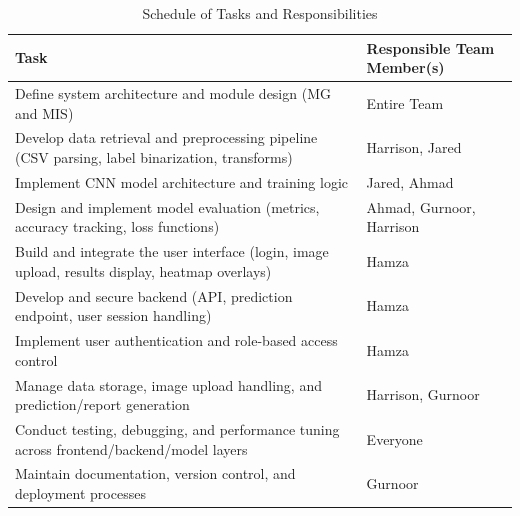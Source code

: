 \documentclass[12pt, titlepage]{article}
\begin{document}
\begin{table}[h!]
\centering
\begin{tabular}{|p{10cm}|l|}
\hline
\textbf{Task} & \textbf{Responsible Team Member(s)} \\
\hline
Define system architecture and module design (MG and MIS) & Entire Team \\
\hline
Develop data retrieval and preprocessing pipeline (CSV parsing, label binarization, transforms) & Harrison, Jared \\
\hline
Implement CNN model architecture and training logic & Jared, Ahmad \\
\hline
Design and implement model evaluation (metrics, accuracy tracking, loss functions) & Ahmad, Gurnoor, Harrison \\
\hline
Build and integrate the user interface (login, image upload, results display, heatmap overlays) & Hamza \\
\hline
Develop and secure backend (API, prediction endpoint, user session handling) & Hamza \\
\hline
Implement user authentication and role-based access control & Hamza \\
\hline
Manage data storage, image upload handling, and prediction/report generation & Harrison, Gurnoor \\
\hline
Conduct testing, debugging, and performance tuning across frontend/backend/model layers & Everyone \\
\hline
Maintain documentation, version control, and deployment processes & Gurnoor \\
\hline
\end{tabular}
\caption{Schedule of Tasks and Responsibilities}
\label{tab:tasks}
\end{table}
\end{document}

